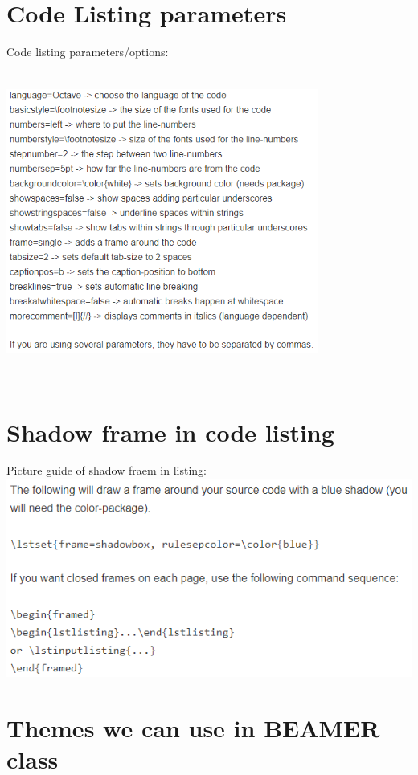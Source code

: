 \section{Code Listing parameters}
Code listing parameters/options:\\
\includegraphics[width=290pt, height=300pt]{../Code listing parameters.png} 

\section{Shadow frame in code listing}
Picture guide of shadow fraem in listing:\\
\includegraphics[scale=1]{../Shadow frame in code listing.png}

\section{Themes we can use in BEAMER class}
